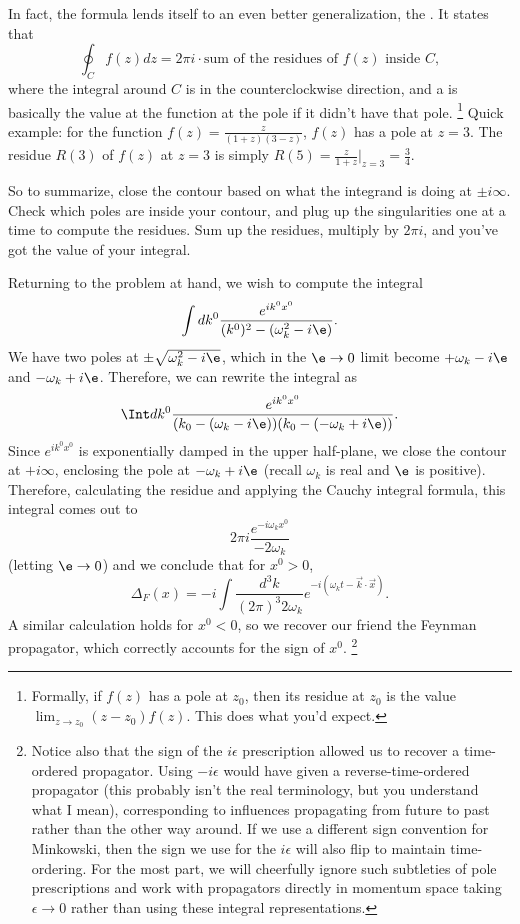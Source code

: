In fact, the formula lends itself to an even better generalization, the . It states that $$\oint_C f(z)dz = 2\pi i\cdot \text{sum of the residues of }f(z) \text{ inside } C,$$ where the integral around $C$ is in the counterclockwise direction, and a  is basically the value at the function at the pole if it didn't have that pole.%
    \footnote{Formally, if $f(z)$ has a pole at $z_0$, then its residue at $z_0$ is the value $\lim_{z\to z_0}(z-z_0) f(z)$. This does what you'd expect.}
Quick example: for the function $f(z)=\frac{z}{(1+z)(3-z)}$, $f(z)$ has a pole at $z=3$. The residue $R(3)$ of $f(z)$ at $z=3$ is simply $R(5)=\frac{z}{1+z}|_{z=3}=\frac{3}{4}.$

So to summarize, close the contour based on what the integrand is doing at $\pm i\infty$. Check which poles are inside your contour, and plug up the singularities one at a time to compute the residues. Sum up the residues, multiply by $2\pi i$, and you've got the value of your integral.

Returning to the problem at hand, we wish to compute the integral
$$\int dk^0 \frac{e^{i k^0 x^0}}{(k^0)^2-(\omega_k^2-i\e)}.$$ We have two poles at $\pm\sqrt{\omega_k^2-i\e}$, which in the $\e\to 0$ limit become $+\omega_k-i\e$ and $-\omega_k+i\e$. Therefore, we can rewrite the integral as
\begin{equation*}
    \Int dk^0 \frac{e^{i k^0 x^0}}{(k_0-(\omega_k-i\e))(k_0-(-\omega_k+i\e))}.
\end{equation*}
Since $e^{ik^0x^0}$ is exponentially damped in the upper half-plane, we close the contour at $+i\infty$, enclosing the pole at $-\omega_k+i\e$ (recall $\omega_k$ is real and $\e$ is positive). Therefore, calculating the residue and applying the Cauchy integral formula, this integral comes out to
$$2\pi i \frac{e^{-i\omega_k x^0}}{-2\omega_k}$$
(letting $\e\to 0$) and we conclude that for $x^0>0$,
$$\Delta_F(x)=-i \int \frac{d^3 k}{(2\pi)^3 2\omega_k}e^{-i(\omega_k t- \vec{k}\cdot \vec{x})}.$$
A similar calculation holds for $x^0 < 0$, so we recover our friend the Feynman propagator, which correctly accounts for the sign of $x^0$.%
    \footnote{Notice also that the sign of the $i\epsilon$ prescription allowed us to recover a time-ordered propagator. Using $-i\epsilon$ would have given a reverse-time-ordered propagator (this probably isn't the real terminology, but you understand what I mean), corresponding to influences propagating from future to past rather than the other way around. If we use a different sign convention for Minkowski, then the sign we use for the $i\epsilon$ will also flip to maintain time-ordering. For the most part, we will cheerfully ignore such subtleties of pole prescriptions and work with propagators directly in momentum space taking $\epsilon\to 0$ rather than using these integral representations.}